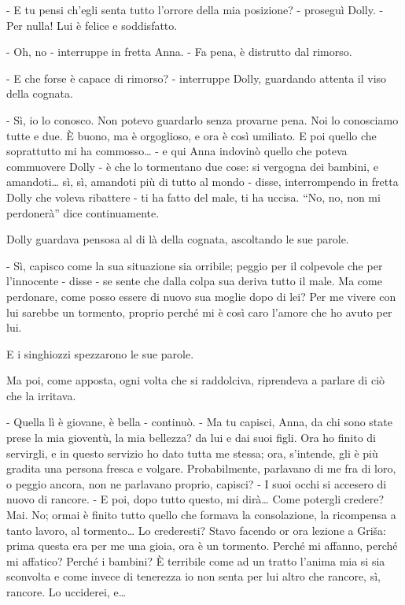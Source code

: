- E tu pensi ch'egli senta tutto l'orrore della mia posizione? - proseguì Dolly. - Per nulla! Lui è felice e soddisfatto. 

- Oh, no - interruppe in fretta Anna. - Fa pena, è distrutto dal rimorso. 

- E che forse è capace di rimorso? - interruppe Dolly, guardando attenta il viso della cognata. 

- Sì, io lo conosco. Non potevo guardarlo senza provarne pena. Noi lo conosciamo tutte e due. È buono, ma è orgoglioso, e ora è così umiliato. E poi quello che soprattutto mi ha commosso\ldots{} - e qui Anna indovinò quello che poteva commuovere Dolly - è che lo tormentano due cose: si vergogna dei bambini, e amandoti\ldots{} sì, sì, amandoti più di tutto al mondo - disse, interrompendo in fretta Dolly che voleva ribattere - ti ha fatto del male, ti ha uccisa. ``No, no, non mi perdonerà'' dice continuamente. 

Dolly guardava pensosa al di là della cognata, ascoltando le sue parole. 

- Sì, capisco come la sua situazione sia orribile; peggio per il colpevole che per l'innocente - disse - se sente che dalla colpa sua deriva tutto il male. Ma come perdonare, come posso essere di nuovo sua moglie dopo di lei? Per me vivere con lui sarebbe un tormento, proprio perché mi è così caro l'amore che ho avuto per lui. 

E i singhiozzi spezzarono le sue parole. 

Ma poi, come apposta, ogni volta che si raddolciva, riprendeva a parlare di ciò che la irritava. 

- Quella lì è giovane, è bella - continuò. - Ma tu capisci, Anna, da chi sono state prese la mia gioventù, la mia bellezza? da lui e dai suoi figli. Ora ho finito di servirgli, e in questo servizio ho dato tutta me stessa; ora, s'intende, gli è più gradita una persona fresca e volgare. Probabilmente, parlavano di me fra di loro, o peggio ancora, non ne parlavano proprio, capisci? - I suoi occhi si accesero di nuovo di rancore. - E poi, dopo tutto questo, mi dirà\ldots{} Come potergli credere? Mai. No; ormai è finito tutto quello che formava la consolazione, la ricompensa a tanto lavoro, al tormento\ldots{} Lo crederesti? Stavo facendo or ora lezione a Griša: prima questa era per me una gioia, ora è un tormento. Perché mi affanno, perché mi affatico? Perché i bambini? È terribile come ad un tratto l'anima mia si sia sconvolta e come invece di tenerezza io non senta per lui altro che rancore, sì, rancore. Lo ucciderei, e\ldots{} 

